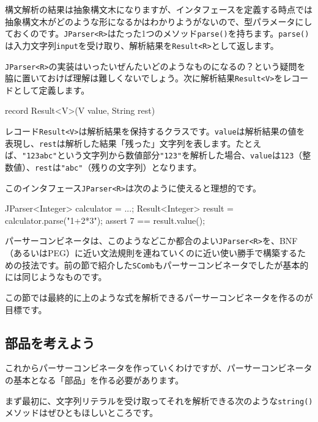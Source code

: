 構文解析の結果は抽象構文木になりますが、インタフェースを定義する時点では抽象構文木がどのような形になるかはわかりようがないので、型パラメータにしておくのです。\texttt{JParser\textless{}R\textgreater{}}はたった1つのメソッド\texttt{parse()}を持ちます。\texttt{parse()}は入力文字列\texttt{input}を受け取り、解析結果を\texttt{Result\textless{}R\textgreater{}}として返します。

\texttt{JParser\textless{}R\textgreater{}}の実装はいったいぜんたいどのようなものになるの？という疑問を脇に置いておけば理解は難しくないでしょう。次に解析結果\texttt{Result\textless{}V\textgreater{}}をレコードとして定義します。

\begin{codescreen}{}
record Result<V>(V value, String rest){}
\end{codescreen}

レコード\texttt{Result\textless{}V\textgreater{}}は解析結果を保持するクラスです。\texttt{value}は解析結果の値を表現し、\texttt{rest}は解析した結果「残った」文字列を表します。たとえば、\texttt{"123abc"}という文字列から数値部分\texttt{"123"}を解析した場合、\texttt{value}は\texttt{123}（整数値）、\texttt{rest}は\texttt{"abc"}（残りの文字列）となります。

このインタフェース\texttt{JParser\textless{}R\textgreater{}}は次のように使えると理想的です。

\begin{codescreen}{}
JParser<Integer> calculator = ...;
Result<Integer> result = calculator.parse("1+2*3");
assert 7 == result.value();
\end{codescreen}

パーサーコンビネータは、このようなどこか都合のよい\texttt{JParser\textless{}R\textgreater{}}を、BNF（あるいはPEG）に近い文法規則を連ねていくのに近い使い勝手で構築するための技法です。前の節で紹介した\texttt{SComb}もパーサーコンビネータでしたが基本的には同じようなものです。

この節では最終的に上のような式を解析できるパーサーコンビネータを作るのが目標です。

\subsection{部品を考えよう}

これからパーサーコンビネータを作っていくわけですが、パーサーコンビネータの基本となる「部品」を作る必要があります。

まず最初に、文字列リテラルを受け取ってそれを解析できる次のような\texttt{string()}メソッドはぜひともほしいところです。


